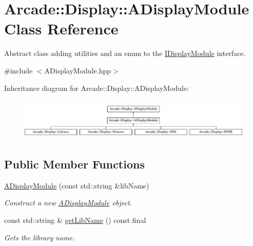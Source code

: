 \hypertarget{classArcade_1_1Display_1_1ADisplayModule}{}\section{Arcade\+::Display\+::A\+Display\+Module Class Reference}
\label{classArcade_1_1Display_1_1ADisplayModule}


Abstract class adding utilities and an enum to the \mbox{\hyperlink{classArcade_1_1Display_1_1IDisplayModule}{I\+Display\+Module}} interface.  




{\ttfamily \#include $<$A\+Display\+Module.\+hpp$>$}

Inheritance diagram for Arcade\+::Display\+::A\+Display\+Module\+:\begin{figure}[H]
\begin{center}
\leavevmode
\includegraphics[height=2.009569cm]{classArcade_1_1Display_1_1ADisplayModule}
\end{center}
\end{figure}
\subsection*{Public Member Functions}
\begin{DoxyCompactItemize}
\item 
\mbox{\hyperlink{classArcade_1_1Display_1_1ADisplayModule_a0aee6322d97b3a421e301c8f0830733e}{A\+Display\+Module}} (const std\+::string \&lib\+Name)
\begin{DoxyCompactList}\small\item\em Construct a new \mbox{\hyperlink{classArcade_1_1Display_1_1ADisplayModule}{A\+Display\+Module}} object. \end{DoxyCompactList}\item 
const std\+::string \& \mbox{\hyperlink{classArcade_1_1Display_1_1ADisplayModule_a0f7d98b279058994f41978b17bb14222}{get\+Lib\+Name}} () const final
\begin{DoxyCompactList}\small\item\em Gets the library name. \end{DoxyCompactList}\end{DoxyCompactItemize}
